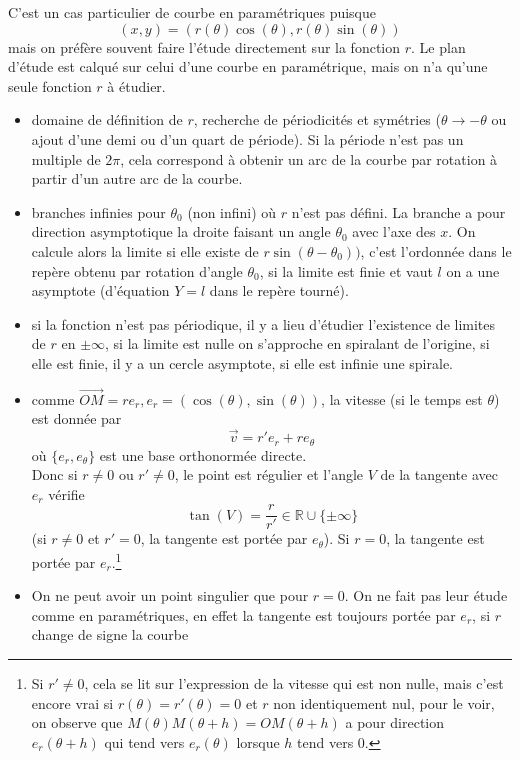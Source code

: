 \documentclass[a4paper,11pt]{article}
\newcommand{\R}{{\mathbb{R}}}
\begin{document}
C'est un cas particulier de courbe en param\'etriques puisque
$$ (x,y)=(r(\theta) \cos(\theta), r(\theta) \sin(\theta))$$
mais on pr\'ef\`ere souvent faire l'\'etude directement sur la
fonction $r$. Le plan d'\'etude est calqu\'e sur celui
d'une courbe en param\'etrique, mais on n'a qu'une seule fonction
$r$ \`a \'etudier.
\begin{itemize}
\item domaine de d\'efinition de $r$, recherche
de p\'eriodicit\'es et sym\'etries ($\theta \rightarrow -\theta$
ou ajout d'une demi ou d'un quart de p\'eriode).
Si la période n'est pas un multiple de $2\pi$, cela correspond
à obtenir un arc de la courbe par rotation à partir d'un autre arc
de la courbe.
\item branches infinies pour $\theta_0$ (non infini)
où $r$ n'est pas d\'efini. La branche a pour direction
asymptotique la droite faisant un angle $\theta_0$ avec
l'axe des $x$. On calcule alors la limite si elle existe de 
$r \sin(\theta-\theta_0))$, c'est l'ordonnée dans
le repère obtenu par rotation d'angle $\theta_0$, si la limite
est finie et vaut $l$
on a une asymptote (d'équation $Y=l$ dans le repère tourné).
\item si la fonction n'est pas périodique, il y a lieu
d'étudier l'existence de limites de $r$ en $\pm \infty$, si la limite
est nulle on s'approche en spiralant de l'origine, si
elle est finie, il y a un cercle asymptote, si elle est
infinie une spirale.
\item comme $\overrightarrow{OM}=r e_r, 
e_r=(\cos(\theta),\sin(\theta))$, 
la vitesse (si le temps est $\theta$) est donnée par 
$$\overrightarrow{v}= r' e_r + r e_\theta$$
où $\{ e_r,e_\theta \}$ est une base orthonormée directe.\\
Donc si $r\neq 0$ ou $r' \neq 0$, le point est régulier et
l'angle $V$ de la tangente avec $e_r$ vérifie 
$$\tan(V)=\frac{r}{r'} \in \R \cup \{ \pm \infty \} $$
(si $r \neq 0$ et $r'=0$, la tangente est portée par $e_\theta$).
Si $r=0$, la tangente est portée par $e_r$.\footnote{Si $r'\neq 0$,
cela se lit sur l'expression de la vitesse qui est non nulle, mais
c'est encore vrai si $r(\theta)=r'(\theta)=0$ et $r$ non identiquement nul, 
pour le voir, on observe que $M(\theta)M(\theta+h)=OM(\theta+h)$ a pour
direction $e_r(\theta+h)$ qui tend vers $e_r(\theta)$ lorsque $h$ tend
vers 0.}
\item On ne peut avoir un point singulier que pour $r=0$. On ne fait
pas leur \'etude comme en param\'etriques, en effet la tangente est
toujours port\'ee par $e_r$, si $r$ change de signe la courbe

\end{itemize}
\end{document}
